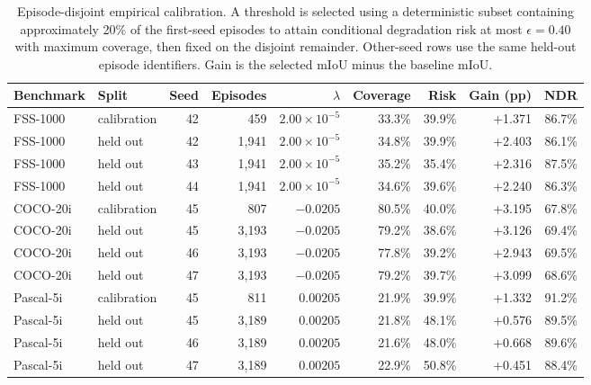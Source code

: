 \documentclass{CVM}
\begin{document}
\begin{table}[h!t]
\center
\caption{Episode-disjoint empirical calibration. A threshold is selected using a deterministic subset containing approximately 20\% of the first-seed episodes to attain conditional degradation risk at most $\epsilon=0.40$ with maximum coverage, then fixed on the disjoint remainder. Other-seed rows use the same held-out episode identifiers. Gain is the selected mIoU minus the baseline mIoU.}
\begin{tabular}{llrrrrrrr}
\toprule
Benchmark & Split & Seed & Episodes & $\lambda$ & Coverage & Risk & Gain (pp) & NDR \\
\midrule
FSS-1000 & calibration & 42 & 459 & $2.00\times10^{-5}$ & 33.3\% & 39.9\% & +1.371 & 86.7\% \\
FSS-1000 & held out & 42 & 1,941 & $2.00\times10^{-5}$ & 34.8\% & 39.9\% & +2.403 & 86.1\% \\
FSS-1000 & held out & 43 & 1,941 & $2.00\times10^{-5}$ & 35.2\% & 35.4\% & +2.316 & 87.5\% \\
FSS-1000 & held out & 44 & 1,941 & $2.00\times10^{-5}$ & 34.6\% & 39.6\% & +2.240 & 86.3\% \\
COCO-20i & calibration & 45 & 807 & $-0.0205$ & 80.5\% & 40.0\% & +3.195 & 67.8\% \\
COCO-20i & held out & 45 & 3,193 & $-0.0205$ & 79.2\% & 38.6\% & +3.126 & 69.4\% \\
COCO-20i & held out & 46 & 3,193 & $-0.0205$ & 77.8\% & 39.2\% & +2.943 & 69.5\% \\
COCO-20i & held out & 47 & 3,193 & $-0.0205$ & 79.2\% & 39.7\% & +3.099 & 68.6\% \\
Pascal-5i & calibration & 45 & 811 & $0.00205$ & 21.9\% & 39.9\% & +1.332 & 91.2\% \\
Pascal-5i & held out & 45 & 3,189 & $0.00205$ & 21.8\% & 48.1\% & +0.576 & 89.5\% \\
Pascal-5i & held out & 46 & 3,189 & $0.00205$ & 21.6\% & 48.0\% & +0.668 & 89.6\% \\
Pascal-5i & held out & 47 & 3,189 & $0.00205$ & 22.9\% & 50.8\% & +0.451 & 88.4\% \\
\bottomrule
\end{tabular}
\label{tab:split_calibration}
\end{table}
\end{document}

